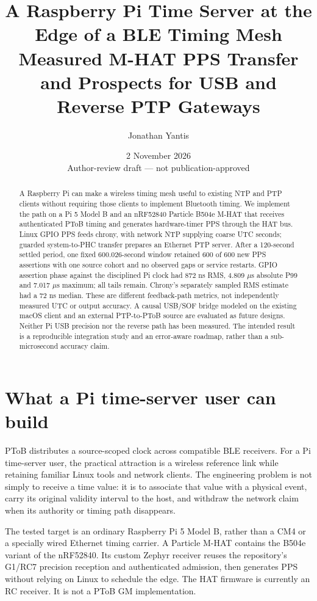 \documentclass[10pt,letterpaper]{article}
\title{\vspace{-1.5em}A Raspberry Pi Time Server at the Edge of a BLE Timing Mesh\\
\large Measured M-HAT PPS Transfer and Prospects for USB and Reverse PTP Gateways}
\author{Jonathan Yantis}
\date{2 November 2026\\\small Author-review draft --- not publication-approved}
\newcommand{\us}{\ensuremath{\mu\mathrm{s}}}
\begin{document}
\maketitle
\vspace{-1em}
\begin{abstract}
A Raspberry Pi can make a wireless timing mesh useful to existing NTP and PTP
clients without requiring those clients to implement Bluetooth timing.
We implement the path on a Pi 5 Model B and an nRF52840 Particle B504e M-HAT that receives
authenticated PToB timing and generates hardware-timer PPS through the HAT bus.
Linux GPIO PPS feeds chrony, with network NTP supplying coarse UTC seconds;
guarded system-to-PHC transfer prepares an Ethernet PTP server.
After a 120-second settled period, one fixed 600.026-second window retained
600 of 600 new PPS assertions with one source cohort and no observed gaps or
service restarts. GPIO assertion phase against the disciplined Pi clock had
872 ns RMS, 4.809 \us{} absolute P99 and 7.017 \us{} maximum; all tails remain.
Chrony's separately sampled RMS estimate had a 72 ns median. These are different
feedback-path metrics, not independently measured UTC or output accuracy.
A causal USB/SOF bridge modeled on the existing macOS client and an external
PTP-to-PToB source are evaluated as future designs. Neither Pi USB precision nor
the reverse path has been measured. The intended result is a reproducible integration
study and an error-aware roadmap, rather than a sub-microsecond accuracy claim.
\end{abstract}

\section{What a Pi time-server user can build}
PToB distributes a source-scoped clock across compatible BLE receivers. For a
Pi time-server user, the practical attraction is a wireless reference link while
retaining familiar Linux tools and network clients. The engineering problem is
not simply to receive a time value: it is to associate that value with a
physical event, carry its original validity interval to the host, and withdraw
the network claim when its authority or timing path disappears.

The tested target is an ordinary Raspberry Pi 5 Model B, rather than a CM4 or
a specially wired Ethernet timing carrier. A Particle M-HAT contains the B504e
variant of the nRF52840. Its custom Zephyr receiver reuses the repository's
G1/RC7 precision reception and authenticated admission, then generates PPS
without relying on Linux to schedule the edge. The HAT firmware is currently
an RC receiver. It is not a PToB GM implementation.
\end{document}
